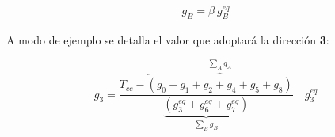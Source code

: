 \begin{align}
	g_{B} = \beta \> g^{eq}_{B} 
\end{align}

A modo de ejemplo se detalla el valor que adoptará la dirección \textbf{3}:

\begin{equation}
	g_{3} = \frac{T_{cc} - \overbrace{\left( g_{0} + g_{1} +g_{2} + g_{4} + g_{5} + g_{8} \right)}^{\sum_{A} g_{A}} }{\underbrace{\left( g^{eq}_{3} + g^{eq}_{6} + g^{eq}_{7} \right)}_{\sum_{B} g_{B} }} \quad g^{eq}_{3}
\end{equation}


